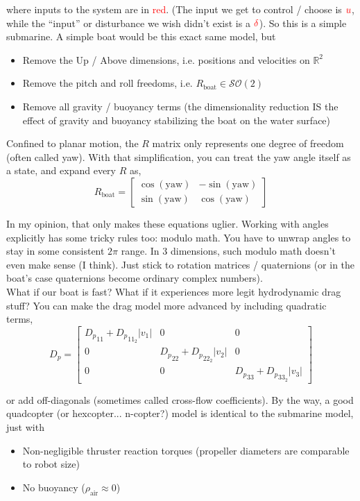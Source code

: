 \documentclass{article}
\def\red#1{\textcolor{red}{#1}}
\begin{document}
where inputs to the system are in \red{red}. (The input we get to control / choose is $\red{u}$, while the ``input'' or disturbance we wish didn't exist is a $\red{\delta}$). So this is a simple submarine. A simple boat would be this exact same model, but
\begin{itemize}
  \item Remove the Up / Above dimensions, i.e. positions and velocities on $\mathbb{R}^2$
  \item Remove the pitch and roll freedoms, i.e. $R_\text{boat} \in \mathcal{SO}(2)$
  \item Remove all gravity / buoyancy terms (the dimensionality reduction IS the effect of gravity and buoyancy stabilizing the boat on the water surface)
\end{itemize}

Confined to planar motion, the $R$ matrix only represents one degree of freedom (often called yaw). With that simplification, you can treat the yaw angle itself as a state, and expand every $R$ as,
$$
R_\text{boat} = \begin{bmatrix} \cos(\text{yaw}) & -\sin(\text{yaw}) \\ \sin(\text{yaw}) & \cos(\text{yaw}) \end{bmatrix}
$$

In my opinion, that only makes these equations uglier. Working with angles explicitly has some tricky rules too: modulo math. You have to unwrap angles to stay in some consistent $2\pi$ range. In 3 dimensions, such modulo math doesn't even make sense (I think). Just stick to rotation matrices / quaternions (or in the boat's case quaternions become ordinary complex numbers).\\

What if our boat is fast? What if it experiences more legit hydrodynamic drag stuff? You can make the drag model more advanced by including quadratic terms,
$$
D_p =
\begin{bmatrix}
  {D_p}_{11} + {D_p}_{11_2}|v_1| & 0      & 0\\
  0      & {D_p}_{22} + {D_p}_{22_2}|v_2| & 0\\
  0      & 0      & {D_p}_{33} + {D_p}_{33_2}|v_3|
\end{bmatrix}
$$

or add off-diagonals (sometimes called cross-flow coefficients). By the way, a good quadcopter (or hexcopter... n-copter?) model is identical to the submarine model, just with
\begin{itemize}
  \item Non-negligible thruster reaction torques (propeller diameters are comparable to robot size)
  \item No buoyancy ($\rho_{\text{air}} \approx 0$)
\end{itemize}
\end{document}
